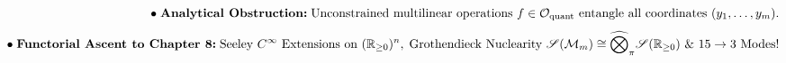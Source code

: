 \documentclass[preview]{standalone}
\begin{document}
\begin{align*}
\special{dvisvgm:raw <g id='unique000'>}\bullet\;\textbf{Analytical Obstruction:}\;\text{Unconstrained multilinear operations }f\in\mathcal{O}_{\text{quant}}\text{ entangle all coordinates }(y_1,\dots,y_m).\\[4pt]\bullet\;\textbf{Functorial Ascent to Chapter 8:}\;\text{Seeley }C^\infty\text{ Extensions on }(\mathbb{R}_{\ge 0})^n,\;\text{Grothendieck Nuclearity }\mathscr{S}(\mathcal{M}_m)\cong\widehat{\bigotimes}_\pi\mathscr{S}(\mathbb{R}_{\ge 0})\text{ \& }15\to 3\text{ Modes!}\special{dvisvgm:raw </g>}
\end{align*}
\end{document}
